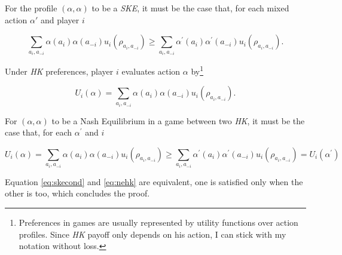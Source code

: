 \begin{skeproof}
	For the profile \((\alpha,\alpha)\) to be a \textit{SKE}, it must be the case that, for each mixed action \(\alpha'\) and player \( i \)

	\begin{equation}\label{eq:skecond}
		\sum_{a_i, a_{-i}} \alpha (a_i) \alpha (a_{-i}) u_i(\rho_{a_i, a_{-i}}) \geq  \sum_{a_i, a_{-i}} \alpha^{\prime} (a_i) \alpha^{\prime} (a_{-i}) u_i(\rho_{a_i, a_{-i}}).
	\end{equation}

	Under \textit{HK} preferences, player \(i\) evaluates action \(\alpha\) by\footnote{Preferences in games are usually represented by utility functions over action profiles. Since \textit{HK} payoff only depends on his action, I can stick with my notation without loss.}

	\[
		U_i(\alpha) = \sum_{a_i, a_{-i}} \alpha (a_i) \alpha (a_{-i}) u_i(\rho_{a_i, a_{-i}}).
	\]

	For \((\alpha,\alpha)\) to be a Nash Equilibrium in a game between two \textit{HK}, it must be the case that, for each \( \alpha^{\prime} \) and \( i \)

	\begin{equation}\label{eq:nehk}
		U_i(\alpha) = \sum_{a_i, a_{-i}} \alpha (a_i) \alpha (a_{-i}) u_i(\rho_{a_i, a_{-i}}) \geq \sum_{a_i, a_{-i}} \alpha^{\prime} (a_i) \alpha^{\prime} (a_{-i}) u_i(\rho_{a_i, a_{-i}}) = U_i (\alpha^{\prime})
	\end{equation}

	Equation \eqref{eq:skecond} and \eqref{eq:nehk} are equivalent, one is satisfied only when the other is too, which concludes the proof.
\end{skeproof}

